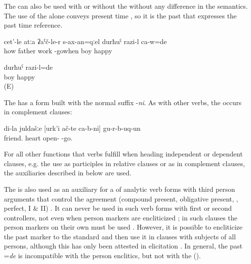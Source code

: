 The   can also be used with  or without the   without any difference in the semantics. The use of the  alone conveys present time , so it is the past  that expresses the past time reference. 

\begin{exe}
	\ex	\label{ex:‎When the father came back from work, the boy was happy}
	\gll	cet'-le	atːa	ʡaˁč-le-r	s-ax-an=qːel	durħuˁ	razi-l	ca-w=de\\
		how	father	work	-gowhen	boy	happy	\\
	\glt	{}

	\ex	\label{ex:The boy was happy.COP}
	\gll	durħuˁ	razi-l=de\\
		boy	happy\\
	\glt	{} (E)
\end{exe}

The  has a  form built with the normal  suffix -\textit{ni}. As with other verbs, the  occurs in complement clauses:

\begin{exe}
	\ex	\label{ex:My friends turned out to be open-hearted.}
	\gll	di-la		juldašːe		[urk'i	ač-te		ca-b-ni]			gu-r-b-uq-un\\
			friend.	heart	open- 		-go.\\
	\glt	{}
\end{exe}

For all other functions that verbs fulfill when heading independent or dependent clauses, e.g. the use as participles in relative clauses or as  in complement clauses, the auxiliaries described in  below are used.\largerpage

The  is also used as an auxiliary for a  of analytic verb forms with third person arguments that control the agreement (compound present, obligative present, , perfect,  I \& II) . It can never be used in such verb forms with first or second  controllers, not even when person markers are encliticized ; in such clauses the person markers on their own must be used . However, it is possible to encliticize the past marker  to the standard  and then use it in clauses with subjects of all persons, although this has only been attested in elicitation . In general, the past  =\textit{de} is incompatible with the person enclitics, but not with the  ().

